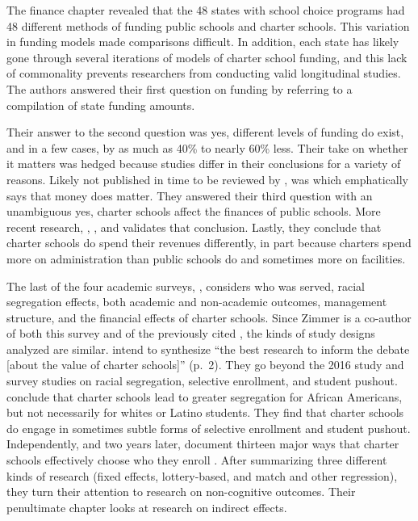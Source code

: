 The finance chapter revealed that the 48 states with school choice programs had 48 different methods of funding public schools and charter schools. This variation in funding models made comparisons difficult. In addition, each state has likely gone through several iterations of models of charter school funding, and this lack of commonality prevents researchers from conducting valid longitudinal studies. The authors answered their first question on funding by referring to a compilation of state funding amounts.

Their answer to the second question was yes, different levels of funding do exist, and in a few cases, by as much as 40\% to nearly 60\% less. Their take on whether it matters was hedged because studies differ in their conclusions for a variety of reasons. Likely not published in time to be reviewed by \citeauthor{PublicAgenda2018}, was \textcite{Baker2018} which emphatically says that money does matter. They answered their third question with an unambiguous yes, charter schools affect the finances of public schools. More recent research, \textcite{Lafer2018}, \textcite{Baker2019},  and \textcite{Miron.etal2021} validates that conclusion. Lastly, they conclude that charter schools do spend their revenues differently, in part because charters spend more on administration than public schools do and sometimes more on facilities. 

The last of the four academic surveys, \textcite{Zimmer.etal2019}, considers who was served, racial segregation effects, both academic and non-academic outcomes, management structure, and the financial effects of charter schools. Since Zimmer is a co-author of both this survey and of the previously cited \textcite{Epple.etal2016}, the kinds of study designs analyzed are similar. \citeauthor{Zimmer.etal2019} intend to synthesize ``the best research to inform the debate [about the value of charter schools]'' (p.~2). They go beyond the 2016 study and survey studies on racial segregation, selective enrollment, and student pushout. \citeauthor{Zimmer.etal2019} conclude that charter schools lead to greater segregation for African Americans, but not necessarily for whites or Latino students. They find that charter schools do engage in sometimes subtle forms of selective enrollment and student pushout. Independently, and two years later, \citeauthor{Mommandi.Welner2021} document thirteen major ways that charter schools effectively choose who they enroll \parencite{Mommandi.Welner2021}. After summarizing three different kinds of research (fixed effects, lottery-based, and match and other regression), they turn their attention to research on non-cognitive outcomes. Their penultimate chapter looks at research on indirect effects.  

